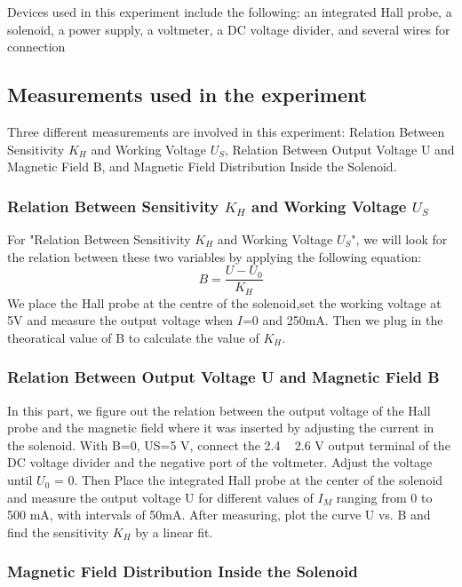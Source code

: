 \documentclass[12pt, a4paper, oneside]{article}
\begin{document}
Devices used in this experiment include the following: an integrated Hall probe, a solenoid, a power supply, a voltmeter, a DC voltage 
divider, and several wires for connection

\subsection{Measurements used in the experiment}
\indent

Three different measurements are involved in this experiment: Relation Between Sensitivity $K_H$ and Working Voltage $U_S$, 
Relation Between Output Voltage U and Magnetic Field B, and Magnetic Field Distribution Inside the Solenoid.

\subsubsection{Relation Between Sensitivity $K_H$ and Working Voltage $U_S$}
\indent

For "Relation Between Sensitivity $K_H$ and Working Voltage $U_S$", we will look for the relation between these two variables by applying
the following equation: 
\begin{equation}
	B=\dfrac{U-U_0}{K_H}
	\label{eq::magnetic field}
\end{equation}
We place the Hall probe at the centre of the solenoid,set the working voltage at 5V and measure the output voltage when $I$=0 and 250mA. 
Then we plug in the theoratical value of B to calculate the value of $K_H$.

\subsubsection{Relation Between Output Voltage U and Magnetic Field B}
\indent

In this part, we figure out the relation between the output voltage of the Hall probe and the magnetic field where it was inserted
by adjusting the current in the solenoid. With B=0, US=5 V, connect the 2.4 ~ 2.6 V output terminal of the DC voltage
divider and the negative port of the voltmeter. Adjust the voltage until $U_0$ = 0. Then Place the integrated Hall probe at the center of the solenoid and measure the output
voltage U for different values of $I_M$ ranging from 0 to 500 mA, with intervals of 50mA. After measuring, 
plot the curve U vs. B and find the sensitivity $K_H$ by a linear fit.

\subsubsection{Magnetic Field Distribution Inside the Solenoid}
\indent
\end{document}
